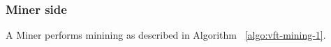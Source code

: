 

\subsubsection{Miner side}

A Miner performs minining as described in Algorithm ~\ref{algo:vft-mining-1}.

